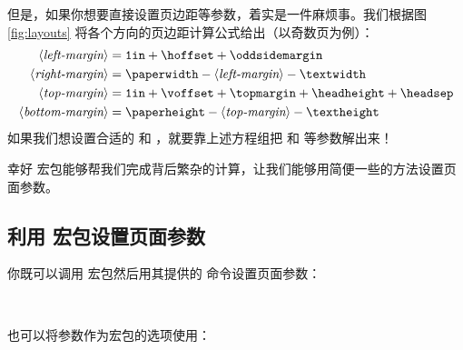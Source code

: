 但是，如果你想要直接设置页边距等参数，着实是一件麻烦事。我们根据图 \ref{fig:layouts} 将各个方向的页边距计算公式给出（以奇数页为例）：
\begin{equation*}
\begin{aligned}
\langle\text{\itshape left-margin}\rangle   &= \text{\ttfamily 1in} 
                                             + \text{\cmd{hoffset}}
                                             + \text{\cmd{oddsidemargin}} \\
\langle\text{\itshape right-margin}\rangle  &= \text{\cmd{paperwidth}} 
                                             - \langle\text{\itshape left-margin}\rangle
                                             - \text{\cmd{textwidth}} \\
\langle\text{\itshape top-margin}\rangle    &= \text{\ttfamily 1in} 
                                             + \text{\cmd{voffset}}
                                             + \text{\cmd{topmargin}}
                                             + \text{\cmd{headheight}}
                                             + \text{\cmd{headsep}} \\
\langle\text{\itshape bottom-margin}\rangle &= \text{\cmd{paperheight}}
                                             - \langle\text{\itshape top-margin}\rangle
                                             - \text{\cmd{textheight}}
\end{aligned}
\end{equation*}
如果我们想设置合适的  和 ，就要靠上述方程组把  和  等参数解出来！

幸好  宏包能够帮我们完成背后繁杂的计算，让我们能够用简便一些的方法设置页面参数。

\subsection{利用  宏包设置页面参数}

你既可以调用  宏包然后用其提供的  命令设置页面参数：
\begin{command}
 \\
\end{command}
也可以将参数作为宏包的选项使用：
\begin{command}
\end{command}

